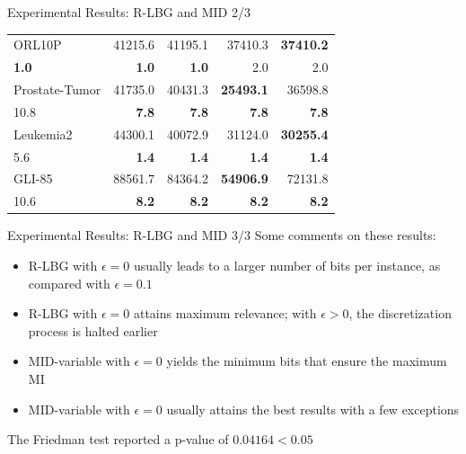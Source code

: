\documentclass{beamer}
\begin{document}
\begin{frame}{Experimental Results: R-LBG and MID 2/3}
\begin{table} [t]
\begin{tabular}{lr|r|r|r|}
	 \multicolumn{1}{|l|}{ORL10P} & 41215.6 & 41195.1 & 37410.3  & \textbf{37410.2}  \\ \cline{2-5}
   \multicolumn{1}{|l|}{\textbf{1.0}}   & \textbf{1.0} & \textbf{1.0} & 2.0 & 2.0  \\ \hline

	 \multicolumn{1}{|l|}{Prostate-Tumor} & 41735.0 & 40431.3 & \textbf{25493.1}  & 36598.8  \\ \cline{2-5}
   \multicolumn{1}{|l|}{10.8}   & \textbf{7.8} & \textbf{7.8} & \textbf{7.8} & \textbf{7.8}  \\
\hline

	 \multicolumn{1}{|l|}{Leukemia2} & 44300.1 & 40072.9 & 31124.0  & \textbf{30255.4} \\ \cline{2-5}
   \multicolumn{1}{|l|}{5.6}   & \textbf{1.4} & \textbf{1.4} & \textbf{1.4} & \textbf{1.4}  \\
\hline

	\multicolumn{1}{|l|}{GLI-85}  & 88561.7 & 84364.2 & \textbf{54906.9} & 72131.8  \\ \cline{2-5}
\multicolumn{1}{|l|}{10.6}   & \textbf{8.2} & \textbf{8.2} & \textbf{8.2} & \textbf{8.2}  \\
\hline
\end{tabular}
\end{table}
\end{frame}


\begin{frame}{Experimental Results: R-LBG and MID 3/3}
Some comments on these results:
\begin{itemize}
	\item R-LBG with $\epsilon=0$ usually leads to a larger number of bits per instance, as compared
with $\epsilon=0.1$
	
	\item R-LBG with $\epsilon=0$ attains maximum relevance; with $\epsilon>0$,
the discretization process is halted earlier

	\item MID-variable with $\epsilon=0$ yields the
minimum bits that ensure the maximum MI

	\item MID-variable with $\epsilon=0$ usually attains 
	the best results with a few exceptions
\end{itemize}

\vfill
The Friedman test reported a p-value of $0.04164 < 0.05$
\end{frame}
\end{document}
